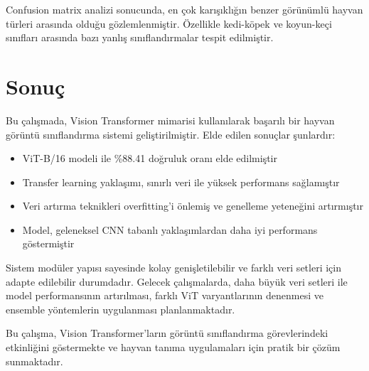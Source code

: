 \documentclass[conference, a4paper]{IEEEtran}
\begin{document}
	Confusion matrix analizi sonucunda, en çok karışıklığın benzer görünümlü hayvan türleri arasında olduğu gözlemlenmiştir. Özellikle kedi-köpek ve koyun-keçi sınıfları arasında bazı yanlış sınıflandırmalar tespit edilmiştir.
	
	\section{Sonuç}
	
	Bu çalışmada, Vision Transformer mimarisi kullanılarak başarılı bir hayvan görüntü sınıflandırma sistemi geliştirilmiştir. Elde edilen sonuçlar şunlardır:
	
	\begin{itemize}
		\item ViT-B/16 modeli ile \%88.41 doğruluk oranı elde edilmiştir
		\item Transfer learning yaklaşımı, sınırlı veri ile yüksek performans sağlamıştır
		\item Veri artırma teknikleri overfitting'i önlemiş ve genelleme yeteneğini artırmıştır
		\item Model, geleneksel CNN tabanlı yaklaşımlardan daha iyi performans göstermiştir
	\end{itemize}
	
	Sistem modüler yapısı sayesinde kolay genişletilebilir ve farklı veri setleri için adapte edilebilir durumdadır. Gelecek çalışmalarda, daha büyük veri setleri ile model performansının artırılması, farklı ViT varyantlarının denenmesi ve ensemble yöntemlerin uygulanması planlanmaktadır.
	
	Bu çalışma, Vision Transformer'ların görüntü sınıflandırma görevlerindeki etkinliğini göstermekte ve hayvan tanıma uygulamaları için pratik bir çözüm sunmaktadır.
	
\end{document}
